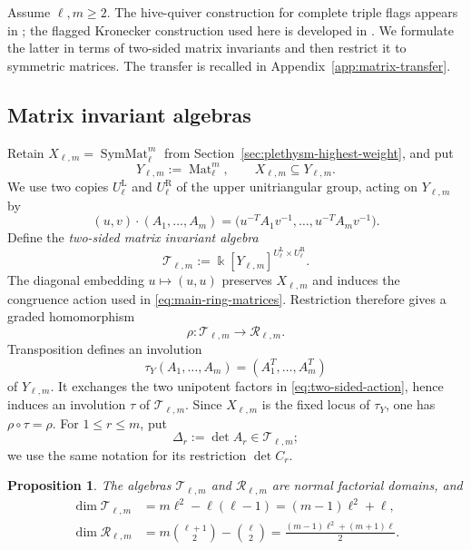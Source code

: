 \documentclass[11pt]{amsart}
\newtheorem{proposition}[theorem]{Proposition}
\theoremstyle{definition}
\theoremstyle{remark}
\newcommand{\kk}{\Bbbk}
\newcommand{\SymMat}{\operatorname{SymMat}}
\newcommand{\cR}{\mathcal R}
\newcommand{\cT}{\mathcal T}
\newcommand{\Mat}{\operatorname{Mat}}
\begin{document}
Assume $\ell,m\ge2$.  The hive-quiver construction for complete triple
flags appears in \cite{Fsemi}; the flagged Kronecker construction used here
is developed in \cite{FeiKroneckerII}.  We formulate the latter in terms of
two-sided matrix invariants and then restrict it to symmetric matrices.  The
transfer is recalled in Appendix~\ref{app:matrix-transfer}.

\subsection{Matrix invariant algebras}
\label{subsec:two-matrix-invariant-algebras}

Retain $X_{\ell,m}=\SymMat_\ell^m$ from Section~\ref{sec:plethysm-highest-weight}, and put
\[ Y_{\ell,m}:=\Mat_\ell^m, \qquad X_{\ell,m}\subseteq Y_{\ell,m}. \]
We use two copies $U_\ell^{\mathrm L}$ and $U_\ell^{\mathrm R}$ of the upper
unitriangular group, acting on $Y_{\ell,m}$ by
\begin{equation}
 (u,v)\cdot(A_1,\ldots,A_m)
 =\bigl(u^{-T}A_1v^{-1},\ldots,u^{-T}A_mv^{-1}\bigr).
 \label{eq:two-sided-action}
\end{equation}
Define the \emph{two-sided matrix invariant algebra}
\[ \cT_{\ell,m} :=\kk[Y_{\ell,m}]^{U_\ell^{\mathrm L}\times U_\ell^{\mathrm R}}. \]
The diagonal embedding $u\mapsto(u,u)$ preserves $X_{\ell,m}$ and induces
the congruence action used in \eqref{eq:main-ring-matrices}.  Restriction
therefore gives a graded homomorphism
\[ \rho:\cT_{\ell,m}\longrightarrow\cR_{\ell,m}. \]
Transposition defines an involution
\[ \tau_Y(A_1,\ldots,A_m)=(A_1^T,\ldots,A_m^T) \]
of $Y_{\ell,m}$.  It exchanges the two unipotent factors in
\eqref{eq:two-sided-action}, hence induces an involution $\tau$ of
$\cT_{\ell,m}$.  Since $X_{\ell,m}$ is the fixed locus of $\tau_Y$,
one has $\rho\circ\tau=\rho.$
For $1\le r\le m$, put
\[ \Delta_r:=\det A_r\in\cT_{\ell,m}; \]
we use the same notation for its restriction $\det C_r$.

\begin{proposition}
\label{prop:basic-rings}
The algebras $\cT_{\ell,m}$ and $\cR_{\ell,m}$ are normal factorial domains,
and
\begin{align*}
 \dim\cT_{\ell,m}
 &=m\ell^2-\ell(\ell-1)=(m-1)\ell^2+\ell,\\
 \dim\cR_{\ell,m}
 &=m\binom{\ell+1}{2}-\binom{\ell}{2}
   =\frac{(m-1)\ell^2+(m+1)\ell}{2}.
\end{align*}
\end{proposition}
\end{document}
